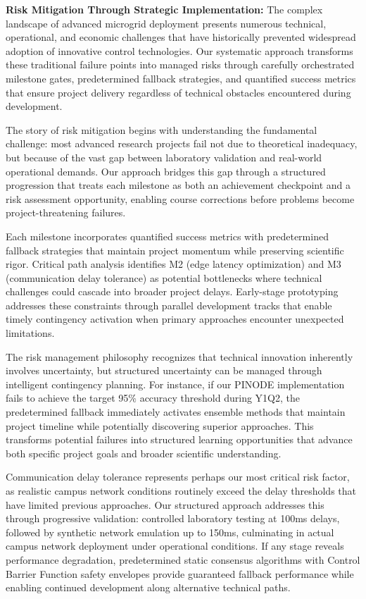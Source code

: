 \documentclass[12pt]{article}
\begin{document}
\textbf{Risk Mitigation Through Strategic Implementation:} The complex landscape of advanced microgrid deployment presents numerous technical, operational, and economic challenges that have historically prevented widespread adoption of innovative control technologies. Our systematic approach transforms these traditional failure points into managed risks through carefully orchestrated milestone gates, predetermined fallback strategies, and quantified success metrics that ensure project delivery regardless of technical obstacles encountered during development.

The story of risk mitigation begins with understanding the fundamental challenge: most advanced research projects fail not due to theoretical inadequacy, but because of the vast gap between laboratory validation and real-world operational demands. Our approach bridges this gap through a structured progression that treats each milestone as both an achievement checkpoint and a risk assessment opportunity, enabling course corrections before problems become project-threatening failures.

Each milestone incorporates quantified success metrics with predetermined fallback strategies that maintain project momentum while preserving scientific rigor. Critical path analysis identifies M2 (edge latency optimization) and M3 (communication delay tolerance) as potential bottlenecks where technical challenges could cascade into broader project delays. Early-stage prototyping addresses these constraints through parallel development tracks that enable timely contingency activation when primary approaches encounter unexpected limitations.

The risk management philosophy recognizes that technical innovation inherently involves uncertainty, but structured uncertainty can be managed through intelligent contingency planning. For instance, if our PINODE implementation fails to achieve the target 95\% accuracy threshold during Y1Q2, the predetermined fallback immediately activates ensemble methods that maintain project timeline while potentially discovering superior approaches. This transforms potential failures into structured learning opportunities that advance both specific project goals and broader scientific understanding.

Communication delay tolerance represents perhaps our most critical risk factor, as realistic campus network conditions routinely exceed the delay thresholds that have limited previous approaches. Our structured approach addresses this through progressive validation: controlled laboratory testing at 100ms delays, followed by synthetic network emulation up to 150ms, culminating in actual campus network deployment under operational conditions. If any stage reveals performance degradation, predetermined static consensus algorithms with Control Barrier Function safety envelopes provide guaranteed fallback performance while enabling continued development along alternative technical paths.
\end{document}
